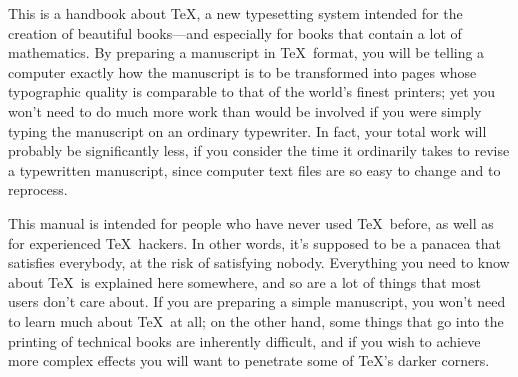 


\nopagenumbers

\hsize 4in

This is a handbook about \TeX, a new typesetting system intended for the creation
of beautiful books---and especially for books that contain a lot of
mathematics. By preparing a manuscript in \TeX\ format, you will be
telling a computer exactly how the manuscript is to be transformed into
pages whose typographic quality is comparable to that of the world's
finest printers; yet you won't need to do much more work than would be
involved if you were simply typing the manuscript on an ordinary
typewriter. In fact, your total work will probably be significantly less,
if you consider the time it ordinarily takes to revise a typewritten manuscript,
since computer text files are so easy to change and to reprocess.

This manual is intended for people who have never used \TeX\ before, as
well as for experienced \TeX\ hackers. In other words, it's supposed to
be a panacea that satisfies everybody, at the risk of satisfying nobody.
Everything you need to know about \TeX\ is explained
here somewhere, and so are a lot of things that most users don't care about.
If you are preparing a simple manuscript, you won't need to
learn much about \TeX\ at all; on the other hand, some
things that go into the printing of technical books are inherently
difficult, and if you wish to achieve more complex effects you
will want to penetrate some of \TeX's darker corners.

\bye
